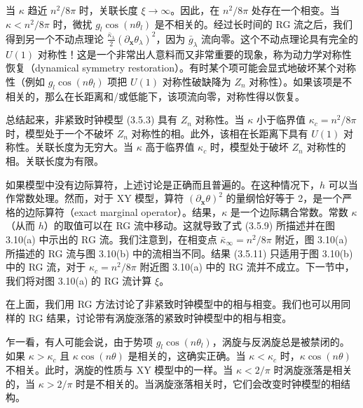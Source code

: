 当 $\kappa$ 趋近 $n^2/8\pi$ 时，关联长度 $\xi \to \infty$。因此，在 $n^2/8\pi$ 处存在一个相变。当 $\kappa < n^2/8\pi$ 时，微扰 $g_l\cos(n\theta_l)$ 是不相关的。经过长时间的 RG 流之后，我们得到另一个不动点理论 $\frac{\bar{\kappa}_\lambda}{2}(\partial_{\pmb{x}}\theta_\lambda)^2$，因为 $\bar{g}_\lambda$ 流向零。这个不动点理论具有完全的 $U(1)$ 对称性！这是一个非常出人意料而又非常重要的现象，称为动力学对称性恢复（dynamical symmetry restoration）。有时某个项可能会显式地破坏某个对称性（例如 $g_l\cos(n\theta_l)$ 项把 $U(1)$ 对称性破缺降为 $Z_n$ 对称性）。如果该项是不相关的，那么在长距离和/或低能下，该项流向零，对称性得以恢复。

总结起来，非紧致时钟模型 (3.5.3) 具有 $Z_n$ 对称性。当 $\kappa$ 小于临界值 $\kappa_c = n^2/8\pi$ 时，模型处于一个不破坏 $Z_n$ 对称性的相。此外，该相在长距离下具有 $U(1)$ 对称性。关联长度为无穷大。当 $\kappa$ 高于临界值 $\kappa_c$ 时，模型处于破坏 $Z_n$ 对称性的相。关联长度为有限。

如果模型中没有边际算符，上述讨论是正确而且普遍的。在这种情况下，$h$ 可以当作常数处理。然而，对于 XY 模型，算符 $(\partial_{\pmb{x}}\theta)^2$ 的量纲恰好等于 2，是一个严格的边际算符（exact marginal operator）。结果，$\kappa$ 是一个边际耦合常数。常数 $\kappa$（从而 $h$）的取值可以在 RG 流中移动。这就导致了式 (3.5.9) 所描述并在图 3.10(a) 中示出的 RG 流。我们注意到，在相变点 $\bar{\kappa}_\infty = n^2/8\pi$ 附近，图 3.10(a) 所描述的 RG 流与图 3.10(b) 中的流相当不同。结果 (3.5.11) 只适用于图 3.10(b) 中的 RG 流，对于 $\kappa_c = n^2/8\pi$ 附近图 3.10(a) 中的 RG 流并不成立。下一节中，我们将对图 3.10(a) 的 RG 流计算 $\xi$。

在上面，我们用 RG 方法讨论了非紧致时钟模型中的相与相变。我们也可以用同样的 RG 结果，讨论带有涡旋涨落的紧致时钟模型中的相与相变。

乍一看，有人可能会说，由于势项 $g_l\cos(n\theta_l)$，涡旋与反涡旋总是被禁闭的。如果 $\kappa > \kappa_c$ 且 $\kappa\cos(n\theta)$ 是相关的，这确实正确。当 $\kappa < \kappa_c$ 时，$\kappa\cos(n\theta)$ 不相关。此时，涡旋的性质与 XY 模型中的一样。当 $\kappa < 2/\pi$ 时涡旋涨落是相关的，当 $\kappa > 2/\pi$ 时是不相关的。当涡旋涨落相关时，它们会改变时钟模型的相结构。

